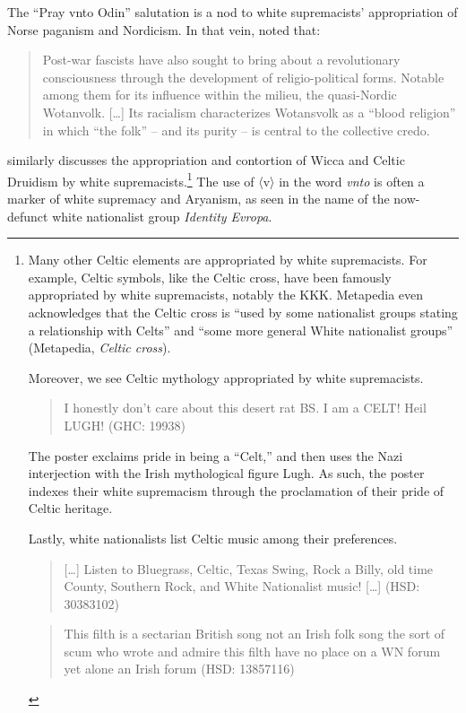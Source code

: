 \documentclass[output=paper,colorlinks,citecolor=brown]{langscibook}
\begin{document}
The “Pray vnto Odin” salutation is a nod to white supremacists' appropriation of Norse paganism \citep{jp:Pollard2016} and Nordicism. In that vein, \citet[249]{jp:Wilson2021} noted that:

\begin{quote}
Post-war fascists have also sought to bring about a revolutionary consciousness through the development of religio-political forms. Notable among them for its influence within the milieu, the quasi-Nordic Wotanvolk. {[}\ldots{]} Its racialism characterizes Wotansvolk as a “blood religion” in which “the folk” -- and its purity -- is central to the collective credo. 
\end{quote}

\noindent \citet{jp:Wilson2021} similarly discusses the appropriation and contortion of Wicca and Celtic Druidism by white supremacists.\footnote{Many other Celtic elements are appropriated by white supremacists. For example, Celtic symbols, like the Celtic cross, have been famously appropriated by white supremacists, notably the KKK. Metapedia even acknowledges that the Celtic cross is ``used by some nationalist groups stating a relationship with Celts'' and ``some more general White nationalist groups'' (Metapedia, \emph{Celtic cross}).

Moreover, we see Celtic mythology appropriated by white supremacists.

\begin{quote}
I honestly don't care about this desert rat BS. I am a CELT! Heil LUGH! (GHC: 19938) 
\end{quote}

\noindent The poster exclaims pride in being a “Celt,” and then uses the Nazi interjection with the Irish mythological figure Lugh. As such, the poster indexes their white supremacism through the proclamation of their pride of Celtic heritage.

Lastly, white nationalists list Celtic music among their preferences.

\begin{quote} 
{[}\ldots{]} Listen to Bluegrass, Celtic, Texas Swing, Rock a Billy, old time County, Southern Rock, and White Nationalist music! {[}\ldots{]}
(HSD: 30383102)
\end{quote}
\begin{quote}
This filth is a sectarian British song not an Irish folk song the sort of scum who wrote and admire this filth have no place on a WN forum yet alone an Irish forum (HSD: 13857116) 
\end{quote}} The use of 〈v〉 in the word \textit{vnto} is often a marker of white supremacy and Aryanism, as seen in the name of the now-defunct white nationalist group \emph{Identity Evropa}.
\end{document}
